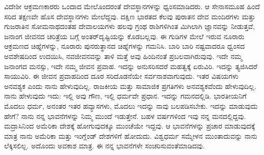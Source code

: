 ವಿದೇಶೀ ಆಕ್ರಮಣಕಾರರು ಒಂದಾದ ಮೇಲೊಂದರಂತೆ ದೇವಸ್ಥಾನಗಳನ್ನು ಧ್ವಂಸಮಾಡಿದರು. ಆ ಸೇನಾಸಮೂಹ ಹಿಂದೆ ಸರಿದ ತಕ್ಷಣವೇ ಹೊಸ ದೇವಸ್ಥಾನಗಳು ಮೇಲೆದ್ದವು. ದಕ್ಷಿಣ ಭಾರತದ ಕೆಲವು ಪುರಾತನ ದೇವ ಮಂದಿರಗಳು ಮತ್ತು ಗುಜರಾತಿನ ಸೋಮನಾಥದಂತಹ ದೇವಾಲಯಗಳು ಹಲವು ಗ್ರಂಥ ರಾಶಿಗಳಿಗಿಂತ ಮಿಗಿಲಾಗಿ ಜ್ಞಾನವನ್ನು ನೀಡುತ್ತವೆ, ಜನಾಂಗ ಜೀವನದ ಚರಿತ್ರೆಯ ಬಗ್ಗೆ ಅಂತರ್​ದೃಷ್ಟಿಯನ್ನು ಕೊಡಬಲ್ಲವು. ಈ ಗುಡಿಗಳ ಮೇಲೆ ಇರುವ ನೂರಾರು ಆಕ್ರಮಣದ ಚಿಹ್ನೆಗಳನ್ನು, ನೂರಾರು ಪುನರುತ್ಥಾನದ ಚಿಹ್ನೆಗಳನ್ನು ಗಮನಿಸಿ. ಬಾರಿ ಬಾರಿ ನಷ್ಟವಾದರೂ ಧ್ವಂಸದ ಅವಶೇಷದಿಂದ ಉದಯಿಸಿ, ನವಜೀವನವನ್ನು ತಾಳಿ ಮತ್ತೆ ಅವು ಹಿಂದಿನಂತೆ ಪ್ರಬಲವಾಗಿರುವುವು. ಇದೇ ನಮ್ಮ ಜನಾಂಗದ ಮನಸ್ಸು, ಇದೇ ನಮ್ಮ ಜೀವನ ಪ್ರವಾಹ. ಇದನ್ನು ಅನುಸರಿಸದರೆ ಮಹತ್ವಕ್ಕೆ ಏರುವಿರಿ. ಇದನ್ನು ತ್ಯಜಿಸಿದರೆ ಸಾಯುವಿರಿ. ಈ ಜೀವನ ಪ್ರವಾಹದಿಂದ ದೂರ ಸರಿದೊಡನೆಯೇ ಸರ್ವನಾಶವಾಗುವುದು. ಇತರ ವಿಷಯಗಳು ಅನವಶ್ಯಕ ಎಂದು ನಾನು ಹೇಳುವುದಿಲ್ಲ. ರಾಜಕೀಯ ಮತ್ತು ಸಾಮಾಜಿಕ ಪ್ರಗತಿಗಳು ಅನವಶ್ಯಕವೆಂದು ಹೇಳುವುದಿಲ್ಲ. ನಾನು ಹೇಳುವುದು ಇದು: ಇಲ್ಲಿ ಅವು ಗೌಣ, ಇಲ್ಲಿ ಧರ್ಮವೇ ಪ್ರಧಾನ. ಇದನ್ನು ಗಮನದಲ್ಲಿಡಿ. ಭಾರತೀಯನಿಗೆ ಮೊದಲು ಧರ್ಮ, ಅನಂತರ ಇತರ ಹವ್ಯಾಸಗಳು, ಮೊದಲು ಇದನ್ನು ನಾವು ಬಲಪಡಿಸಬೇಕು. ಇದನ್ನು ಮಾಡುವುದು ಹೇಗೆ? ನಾನು ನನ್ನ ಭಾವನೆಗಳನ್ನು ನಿಮ್ಮ ಮುಂದೆ ಇಡುತ್ತೇನೆ. ಬಹಳ ವರ್ಷಗಳಿಂದ ಇವು ನನ್ನ ಮನದಲ್ಲಿದ್ದವು. ಮದ್ರಾಸಿನಿಂದ ಅಮೆರಿಕಾ ದೇಶಕ್ಕೆ ಹೋಗುವುದಕ್ಕೂ ಮುಂಚೆಯೇ ಇದ್ದವು. ಆ ಭಾವನೆಗಳನ್ನು ಪ್ರಚಾರ ಮಾಡುವುದಕ್ಕೆ ಮಾತ್ರ ನಾನು ಅಮೆರಿಕಾ ಮತ್ತು ಇಂಗ್ಲೆಂಡ್​ ದೇಶಗಳಿಗೆ ಹೋದುದು. ವಿಶ್ವಧರ್ಮ ಸಮ್ಮೇಳನ ಮುಂತಾದುವನ್ನು ನಾನು ಲೆಕ್ಕಿಸಲಿಲ್ಲ. ಅದೊಂದು ಅವಕಾಶ ಮಾತ್ರ. ಈ ನನ್ನ ಭಾವನೆಗಳೇ ಸಂಚರಿಸುವಂತೆಮಾಡಿದವು.

